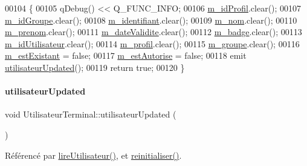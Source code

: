 \begin{DoxyCode}
00104 \{
00105     qDebug() << Q\_FUNC\_INFO;
00106     \hyperlink{class_utilisateur_terminal_af3d06352ecbd2d4439626b4ba53b55be}{m\_idProfil}.clear();
00107     \hyperlink{class_utilisateur_terminal_a669ece5480e25b47711c430d020581c2}{m\_idGroupe}.clear();
00108     \hyperlink{class_utilisateur_terminal_a4dd1abd0c87ed9bf99ab3343e17cef43}{m\_identifiant}.clear();
00109     \hyperlink{class_utilisateur_terminal_a4b48835dcadacd5e7d5c9662b70cdc7d}{m\_nom}.clear();
00110     \hyperlink{class_utilisateur_terminal_a6dc3be09e844fc14aafec8019a1e2a5e}{m\_prenom}.clear();
00111     \hyperlink{class_utilisateur_terminal_a7af3e6861711071624b93544adf3ca48}{m\_dateValidite}.clear();
00112     \hyperlink{class_utilisateur_terminal_a06e0603919eb3846cf5bd232c105d1a7}{m\_badge}.clear();
00113     \hyperlink{class_utilisateur_terminal_a3a8aeb429529ae1600c799e427370f78}{m\_idUtilisateur}.clear();
00114     \hyperlink{class_utilisateur_terminal_ac25eb049eaa55bc16d2f516a551eb769}{m\_profil}.clear();
00115     \hyperlink{class_utilisateur_terminal_a824944eb7dc8689a0b0ecfa2fc9e4e6c}{m\_groupe}.clear();
00116     \hyperlink{class_utilisateur_terminal_a6b16983fcb2b0f1f698f595309a67828}{m\_estExistant} = \textcolor{keyword}{false};
00117     \hyperlink{class_utilisateur_terminal_a79d15bdf8428eb1a131ce4801ac619aa}{m\_estAutorise} = \textcolor{keyword}{false};
00118     emit \hyperlink{class_utilisateur_terminal_ade3153552e04d348ddb5c1ebdb95450a}{utilisateurUpdated}();
00119     \textcolor{keywordflow}{return} \textcolor{keyword}{true};
00120 \}
\end{DoxyCode}
\mbox{\label{class_utilisateur_terminal_ade3153552e04d348ddb5c1ebdb95450a}} 
\paragraph{\texorpdfstring{utilisateur\+Updated}{utilisateurUpdated}}
{\footnotesize\ttfamily void Utilisateur\+Terminal\+::utilisateur\+Updated (\begin{DoxyParamCaption}{ }\end{DoxyParamCaption})\hspace{0.3cm}{\ttfamily [signal]}}



Référencé par \hyperlink{class_utilisateur_terminal_a196420ecc14bc0645e3e1c66d796b8e6}{lire\+Utilisateur()}, et \hyperlink{class_utilisateur_terminal_a63b37fa7cbf08976e5a09cbfbdb55f42}{reinitialiser()}.



